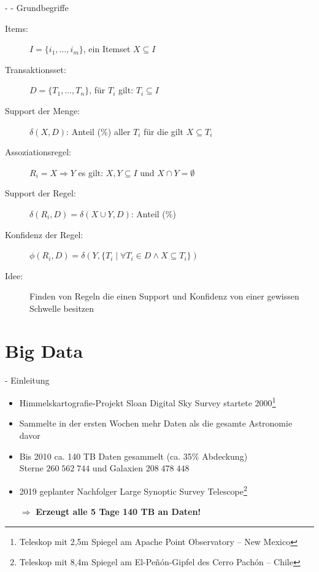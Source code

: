 \documentclass[fleqn,11pt,aspectratio=43]{beamer}
\begin{document}
\begin{frame}{\insertsectionhead - \insertsubsectionhead - Grundbegriffe \cite{ester2000knowledge}}
\begin{description}
\item[Items:] $I = \{i_1, \ldots, i_m\}$, ein Itemset $X \subseteq I$
\item[Transaktionsset:] $D = \{T_1, \ldots, T_n\}$, für $T_i$ gilt: $T_i \subseteq I$
\item[Support der Menge:] $\delta(X,D)$: Anteil (\%) aller $T_i$ für die gilt $X \subseteq T_i$
\item[Assoziationsregel:] $R_i = X \Rightarrow Y$ es gilt: $X, Y \subseteq I$ und $X \cap Y = \emptyset$ 
\item[Support der Regel:] $\delta(R_i, D) = \delta(X \cup Y, D)$: Anteil (\%)
\item[Konfidenz der Regel:] $\phi(R_i, D) = \delta(Y, \{T_i\;|\;\forall T_i \in D \wedge X \subseteq T_i\})$
\item[Idee:] Finden von Regeln die einen Support und Konfidenz von einer gewissen Schwelle besitzen
\end{description}
\end{frame}
		

\section{Big Data~}

\begin{frame}{\insertsectionhead - Einleitung \cite{mayer2014big} \cite{wu2014data}}
\begin{itemize}
\item Himmelskartografie-Projekt Sloan Digital Sky Survey startete 2000\footnote{Teleskop mit 2,5m Spiegel am Apache Point Observatory -- New Mexico}
\item Sammelte in der ersten Wochen mehr Daten als die gesamte Astronomie davor\\ \vspace{1em}

\item Bis 2010 ca. 140 TB Daten gesammelt (ca. 35\% Abdeckung)\\
		Sterne	$260\;562\;744$ und Galaxien $208\;478\;448$ \cite{sdss3_scope:Online}
\item 2019 geplanter Nachfolger Large Synoptic Survey Telescope\footnote{Teleskop mit 8,4m Spiegel am El-Peñón-Gipfel des Cerro Pachón -- Chile} \\ \vspace{1em}
\item[$\Rightarrow$] \textbf{Erzeugt alle 5 Tage 140 TB an Daten!}
\end{itemize}
\end{frame}
\end{document}

